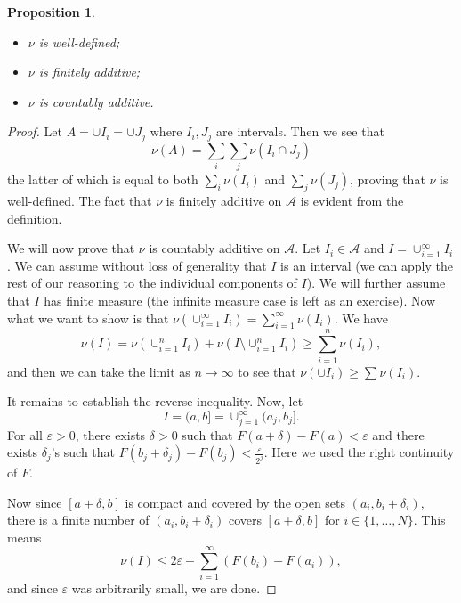 \documentclass{article}
\newtheorem{proposition}[theorem]{Proposition}
\theoremstyle{definition}
\begin{document}
\begin{proposition}
\begin{itemize}
    \item \(\nu\) is well-defined;
    \item \(\nu\) is finitely additive;
    \item \(\nu\) is countably additive.
\end{itemize}
\end{proposition}
\begin{proof}
    Let \( A = \cup I_{i} = \cup J_{j} \) where \( I_{i}, J_{j} \) are
    intervals. Then we see that
    \begin{displaymath}
        \nu(A) = \sum_{i} \sum_{j} \nu(I_{i} \cap J_{j})
    \end{displaymath}
    the latter of which is equal to both \( \sum_{i} \nu(I_{i}) \) and \(
    \sum_{j} \nu(J_{j}) \), proving that \(\nu\) is well-defined.
		The fact that $\nu$ is finitely additive on $\mathcal{A}$ is 
		evident from the definition.

		\medskip

		We will now prove that $\nu$ is countably additive on 
		$\mathcal{A}$.
    Let \( I_{i} \in \mathcal{A} \) and \( I = \cup_{i = 1}^{\infty} I
    _{i} \). We can assume without loss of generality that \( I \) is an
    interval (we can apply the rest of our reasoning to the individual components of \(
    I \)). We will further assume that \( I \) has finite measure (the
    infinite measure case is left as an exercise).
    Now what we want to show is that \( \nu(\cup_{i = 1}^{\infty}
    I_{i}) = \sum_{i = 1}^{\infty} \nu(I_{i}) \).
    We have
    \begin{displaymath}
        \nu(I) = \nu(\cup_{i = 1}^{n} I_{i}) + \nu(I \setminus
        \cup_{i = 1}^{n} I_{i}) \geq \sum_{i = 1}^{n} \nu(I_{i}),
    \end{displaymath}
    and then we can take the limit as $n\to\infty$ to see that
		$\nu(\cup I_i)\ge\sum \nu(I_i)$. 

		\medskip

		It remains to establish the reverse inequality.
    Now, let 
		$$I = (a,b] = \cup_{j = 1}^{\infty} (a_{j}, b_{j}].$$ For
    all \( \varepsilon > 0 \), there exists \( \delta > 0 \) such that \(
    F(a + \delta) - F(a) < \varepsilon \) and there exists \( \delta_{j}
    \)'s such that \( F(b_{j} + \delta_{j}) - F(b_{j}) <
    \frac{\varepsilon}{2^{j}} \).
		Here we used the right continuity of $F$.

    Now since \( [a + \delta,b] \) is compact and covered by the open sets
    \( (a_{i}, b_{i} + \delta_{i}) \), there is a finite number of \(
    (a_{i}, b_{i} + \delta_{i})
    \) covers \( [a + \delta,b] \) for \( i \in \{ 1 , \dots , N \} \). This
    means
    \begin{displaymath}
			\nu(I) \leq 2 \varepsilon + \sum_{i = 1}^{\infty} (F(b_{i}) - F(a_{i})),
    \end{displaymath}
		and since $\varepsilon$ was arbitrarily small, we are done.
\end{proof}
\end{document}
